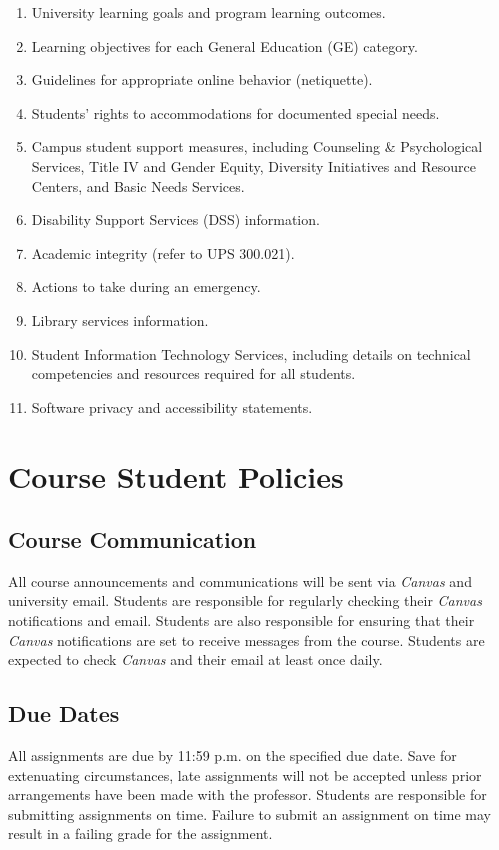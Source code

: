 \documentclass[11pt, letterpaper]{article}
\begin{document}
\begin{enumerate}
    \item   University learning goals and program learning outcomes.
    \item	Learning objectives for each General Education (GE) category.
    \item	Guidelines for appropriate online behavior (netiquette).
    \item	Students' rights to accommodations for documented special needs.
    \item   Campus student support measures, including Counseling \& Psychological Services, Title IV and Gender Equity, Diversity Initiatives and Resource Centers, and Basic Needs Services.
    \item   Disability Support Services (DSS) information.
    \item	Academic integrity (refer to UPS 300.021).
    \item	Actions to take during an emergency.
    \item	Library services information.
    \item	Student Information Technology Services, including details on technical competencies and resources required for all students.
    \item	Software privacy and accessibility statements.
\end{enumerate}

\section{Course Student Policies}

\subsection*{Course Communication}
All course announcements and communications will be sent via \emph{Canvas} and university email. Students are responsible for regularly checking their \emph{Canvas} notifications and email. Students are also responsible for ensuring that their \emph{Canvas} notifications are set to receive messages from the course. Students are expected to check \emph{Canvas} and their email at least once daily.

\subsection*{Due Dates}
All assignments are due by 11:59 p.m. on the specified due date. Save for extenuating circumstances, late assignments will not be accepted unless prior arrangements have been made with the professor. Students are responsible for submitting assignments on time. Failure to submit an assignment on time may result in a failing grade for the assignment. 
\end{document}
